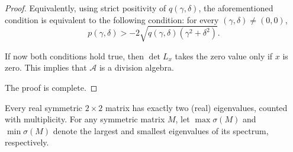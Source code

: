 \documentclass{amsart}
\theoremstyle{definition}
\theoremstyle{plain}
\begin{document}
\begin{proof}
Equivalently, using strict positivity of $q(\gamma,\delta)$, the aforementioned condition is equivalent to the following condition: for every $(\gamma,\delta)\neq(0,0)$,
$$p(\gamma,\delta)> -2\sqrt{q(\gamma,\delta)(\gamma^2+\delta^2)}.$$

If now both conditions hold true, then $\det L_x$ takes the zero value only if $x$ is zero. This implies that $\mathcal A$ is a division algebra. 

The proof is complete.

\end{proof}
Every real symmetric $2 \times 2$ matrix has exactly two (real) eigenvalues, counted with multiplicity. For any symmetric matrix $M$, let $\max \sigma(M)$ and $\min \sigma(M)$ denote the largest and smallest eigenvalues of its spectrum, respectively.
\end{document}
